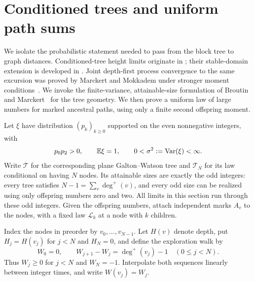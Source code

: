 \section{Conditioned trees and uniform path sums}
\label{tree:section}

We isolate the probabilistic statement needed to pass from the block tree
to graph distances. Conditioned-tree height limits originate in
\cite{Aldous1993}; their stable-domain extension is developed in
\cite{Duquesne2003}. Joint depth-first process convergence to the same
excursion was proved by Marckert and Mokkadem under stronger moment
conditions~\cite{MarckertMokkadem2003}. We invoke the finite-variance,
attainable-size formulation of Broutin and
Marckert~\cite{BroutinMarckert2014} for the tree geometry.  We then prove a
uniform law of large numbers for marked ancestral paths, using only a
finite second offspring moment.

Let $\xi$ have distribution $(p_k)_{k\geq0}$ supported on the even
nonnegative integers, with
\begin{equation}
 p_0p_2>0,\qquad \mathbb E\xi=1,\qquad
 0<\sigma^2:=\operatorname{Var}(\xi)<\infty.
 \label{tree:assumptions}
\end{equation}
Write $\mathcal T$ for the corresponding plane Galton--Watson tree and
$\mathcal T_N$ for its law conditional on having $N$ nodes.  Its attainable
sizes are exactly the odd integers: every tree satisfies
$N-1=\sum_v\deg^+(v)$, and every odd size can be realized using only
offspring numbers zero and two.  All limits in this section run through
these odd integers.  Given the offspring numbers, attach independent
marks $A_v$ to the nodes, with a fixed law $\mathcal L_k$ at a node with
$k$ children.

Index the nodes in preorder by $v_0,\ldots,v_{N-1}$.  Let $H(v)$ denote
depth, put $H_j=H(v_j)$ for $j<N$ and $H_N=0$, and define the
exploration walk by
\begin{equation}
 W_0=0,\qquad W_{j+1}-W_j=\deg^+(v_j)-1
 \quad(0\leq j<N).
 \label{tree:walk-definition}
\end{equation}
Thus $W_j\geq0$ for $j<N$ and $W_N=-1$.  Interpolate both sequences
linearly between integer times, and write $W(v_j)=W_j$.

